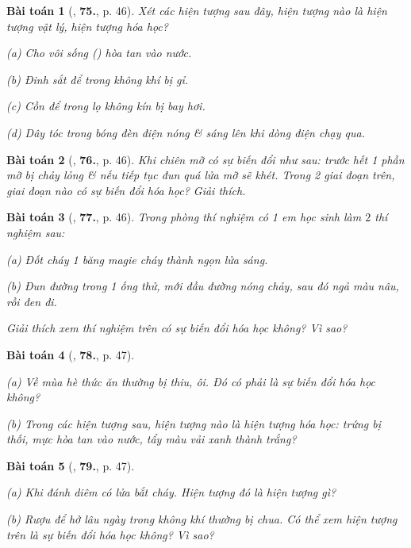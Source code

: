 \documentclass{article}
\numberwithin{equation}{section}
\newtheorem{baitoan}{Bài toán}
\begin{document}
\begin{baitoan}[\cite{An_400_BT_Hoa_Hoc_8_2020}, \textbf{75.}, p. 46]
	Xét các hiện tượng sau đây, hiện tượng nào là hiện tượng vật lý, hiện tượng hóa học?
	\begin{enumerate*}
		\item[(a)] Cho vôi sống () hòa tan vào nước.
		\item[(b)] Đinh sắt để trong không khí bị gỉ.
		\item[(c)] Cồn để trong lọ không kín bị bay hơi.
		\item[(d)] Dây tóc trong bóng đèn điện nóng \& sáng lên khi dòng điện chạy qua.
	\end{enumerate*}
\end{baitoan}

\begin{baitoan}[\cite{An_400_BT_Hoa_Hoc_8_2020}, \textbf{76.}, p. 46]
	Khi chiên mỡ có sự biến đổi như sau: trước hết 1 phần mỡ bị chảy lỏng \& nếu tiếp tục đun quá lửa mỡ sẽ khét. Trong 2 giai đoạn trên, giai đoạn nào có sự biến đổi hóa học? Giải thích.
\end{baitoan}

\begin{baitoan}[\cite{An_400_BT_Hoa_Hoc_8_2020}, \textbf{77.}, p. 46]
	Trong phòng thí nghiệm có 1 em học sinh làm $2$ thí nghiệm sau:
	\begin{enumerate*}
		\item[(a)] Đốt cháy 1 băng magie cháy thành ngọn lửa sáng.
		\item[(b)] Đun đường trong 1 ống thử, mới đầu đường nóng chảy, sau đó ngả màu nâu, rồi đen đi.
	\end{enumerate*}
	Giải thích xem thí nghiệm trên có sự biến đổi hóa học không? Vì sao?
\end{baitoan}

\begin{baitoan}[\cite{An_400_BT_Hoa_Hoc_8_2020}, \textbf{78.}, p. 47]
	\begin{enumerate*}
		\item[(a)] Về mùa hè thức ăn thường bị thiu, ôi. Đó có phải là sự biến đổi hóa học không?
		\item[(b)] Trong các hiện tượng sau, hiện tượng nào là hiện tượng hóa học: trứng bị thối, mực hòa tan vào nước, tẩy màu vải xanh thành trắng?
	\end{enumerate*}
\end{baitoan}

\begin{baitoan}[\cite{An_400_BT_Hoa_Hoc_8_2020}, \textbf{79.}, p. 47]
\begin{enumerate*}
	\item[(a)] Khi đánh diêm có lửa bắt cháy. Hiện tượng đó là hiện tượng gì?
	\item[(b)] Rượu để hở lâu ngày trong không khí thường bị chua. Có thể xem hiện tượng trên là sự biến đổi hóa học không? Vì sao?
	\end{enumerate*}
\end{baitoan}
\end{document}
